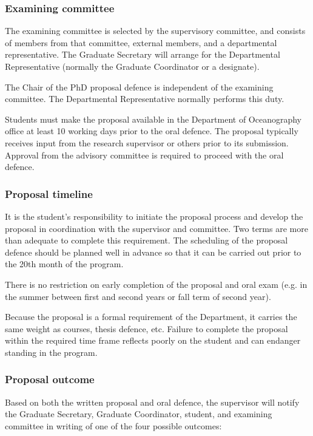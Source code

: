 \documentclass[12pt]{article}
\begin{document}
\subsubsection{Examining committee}

The examining committee is selected by the supervisory committee, and consists
of members from that committee, external members, and a departmental
representative. The Graduate Secretary will arrange for the Departmental
Representative (normally the Graduate Coordinator or a designate).

The Chair of the PhD proposal defence is independent of the examining
committee. The Departmental Representative normally performs this duty.

Students must make the proposal available in the Department of Oceanography
office at least 10 working days prior to the oral defence.  The proposal
typically receives input from the research supervisor or others prior to its
submission. Approval from the advisory committee is required to proceed with
the oral defence.

\subsubsection{Proposal timeline}

It is the student's responsibility to initiate the proposal process and develop
the proposal in coordination with the supervisor and committee. Two terms are
more than adequate to complete this requirement. The scheduling of the proposal
defence should be planned well in advance so that it can be carried out prior
to the 20th month of the program.

There is no restriction on early completion of the proposal and oral exam (e.g.
in the summer between first and second years or fall term of second year).

Because the proposal is a formal requirement of the Department, it carries the
same weight as courses, thesis defence, etc. Failure to complete the proposal
within the required time frame reflects poorly on the student and can endanger
standing in the program.


\subsubsection{Proposal outcome}

Based on both the written proposal and oral defence, the supervisor will notify
the Graduate Secretary, Graduate Coordinator, student, and examining committee
in writing of one of the four possible outcomes:
\end{document}
